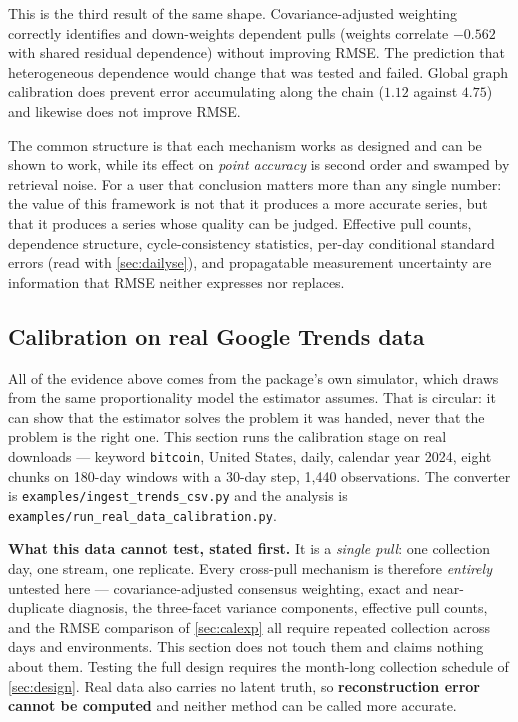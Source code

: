 \documentclass[12pt,a4paper,oneside]{article}
\begin{document}
\begin{remark}\label{rem:pattern}
This is the third result of the same shape. Covariance-adjusted weighting
correctly identifies and down-weights dependent pulls (weights correlate
$-0.562$ with shared residual dependence) without improving RMSE. The prediction
that heterogeneous dependence would change that was tested and failed. Global
graph calibration does prevent error accumulating along the chain ($1.12$ against
$4.75$) and likewise does not improve RMSE.

The common structure is that each mechanism works as designed and can be shown
to work, while its effect on \emph{point accuracy} is second order and swamped
by retrieval noise. For a user that conclusion matters more than any single
number: the value of this framework is not that it produces a more accurate
series, but that it produces a series whose quality can be judged. Effective
pull counts, dependence structure, cycle-consistency statistics, per-day
conditional standard errors (read with \cref{sec:dailyse}), and propagatable
measurement uncertainty are information that RMSE neither expresses nor replaces.
\end{remark}

\subsection{Calibration on real Google Trends data}\label{sec:realdata}

All of the evidence above comes from the package's own simulator, which draws
from the same proportionality model the estimator assumes. That is circular: it
can show that the estimator solves the problem it was handed, never that the
problem is the right one. This section runs the calibration stage on real
downloads --- keyword \texttt{bitcoin}, United States, daily, calendar year 2024,
eight chunks on 180-day windows with a 30-day step, 1{,}440 observations. The
converter is \texttt{examples/\allowbreak ingest\_\allowbreak trends\_\allowbreak csv.py} and the analysis is
\texttt{examples/\allowbreak run\_\allowbreak real\_\allowbreak data\_\allowbreak calibration.py}.

\textbf{What this data cannot test, stated first.} It is a \emph{single pull}:
one collection day, one stream, one replicate. Every cross-pull mechanism is
therefore \emph{entirely} untested here --- covariance-adjusted consensus
weighting, exact and near-duplicate diagnosis, the three-facet variance
components, effective pull counts, and the RMSE comparison of
\cref{sec:calexp} all require repeated collection across days and environments.
This section does not touch them and claims nothing about them. Testing the full
design requires the month-long collection schedule of \cref{sec:design}. Real
data also carries no latent truth, so \textbf{reconstruction error cannot be
computed} and neither method can be called more accurate.
\end{document}

